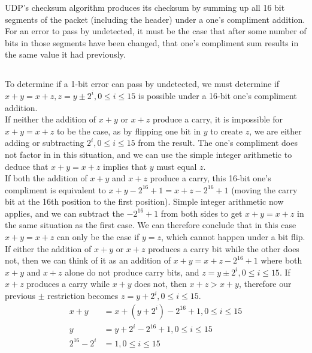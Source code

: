 \documentclass[12pt]{article}
\begin{document}
UDP's checksum algorithm produces its checksum by summing up all 16 bit segments
of the packet (including the header) under a one's compliment addition.  For an
error to pass by undetected, it must be the case that after some number of bits
in those segments have been changed, that one's compliment sum results in the
same value it had previously.

\subsection{}

To determine if a 1-bit error can pass by undetected, we must determine if $x + y =
x + z, z = y \pm 2^i, 0 \leq i \leq 15$ is possible under a 16-bit one's
compliment addition.\\

If neither the addition of $x + y$ or $x + z$ produce a carry, it is impossible
for $x + y = x + z$ to be the case, as by flipping one bit in $y$ to create $z$,
we are either adding or subtracting $2^i, 0 \leq i \leq 15$ from the result.
The one's compliment does not factor in in this situation, and we can use the
simple integer arithmetic to deduce that $x + y = x + z$ implies that $y$ must
equal $z$.\\

If both the addition of $x + y$ and $x + z$ produce a carry, this 16-bit one's
compliment is equivalent to $x + y - 2^{16} + 1 = x + z - 2^{16} + 1$ (moving
the carry bit at the 16th position to the first position).  Simple integer
arithmetic now applies, and we can subtract the $-2^{16} + 1$ from both sides to
get $x + y = x + z$ in the same situation as the first case.  We can therefore
conclude that in this case $x + y = x + z$ can only be the case if $y = z$,
which cannot happen under a bit flip.\\

If either the addition of $x + y$ or $x + z$ produces a carry bit while the
other does not, then we can think of it as an addition of $x + y = x + z -
2^{16}+ 1$ where both $x + y$ and $x + z$ alone do not produce carry bits, and
$z = y \pm 2^i, 0 \leq i \leq 15$.  If $x + z$ produces a carry while $x + y$
does not, then $x + z > x + y$, therefore our previous $\pm$ restriction becomes
$z = y + 2^i, 0 \leq i \leq 15$.\\

$$\begin{aligned}
   x + y &= x + (y + 2^i) - 2^{16} + 1, 0 \leq i \leq 15\\
   y &= y + 2^i - 2^{16} + 1, 0 \leq i \leq 15\\
   2^{16} - 2^i &= 1, 0 \leq i \leq 15\\
\end{aligned}$$
\end{document}
